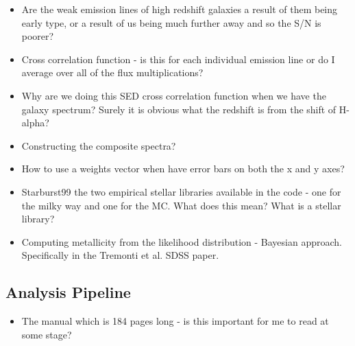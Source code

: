 \documentclass{literature}
\begin{document}
\begin{itemize}
	\item Are the weak emission lines of high redshift galaxies a result of them being early type, or a result of us being much further away and so the S/N is poorer? 
	\item Cross correlation function - is this for each individual emission line or do I average over all of the flux multiplications?
	\item Why are we doing this SED cross correlation function when we have the galaxy spectrum? Surely it is obvious what the redshift is from the shift of H-alpha?
	\item Constructing the composite spectra?
	\item How to use a weights vector when have error bars on both the x and y axes? 
	\item Starburst99 the two empirical stellar libraries available in the code - one for the milky way and one for the MC. What does this mean? What is a stellar library?
	\item Computing metallicity from the likelihood distribution - Bayesian approach. Specifically in the Tremonti et al. SDSS paper.

\end{itemize}

\subsection{Analysis Pipeline}\label{que:analysis_pipeline}
\begin{itemize}
	\item The manual which is 184 pages long - is this important for me to read at some stage?
\end{itemize}


\clearpage 


\end{document}
